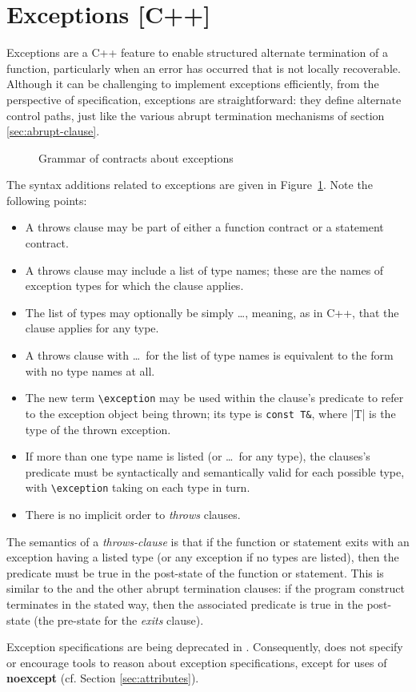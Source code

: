 \section{Exceptions [C++]}
\label{sec:exceptions}

Exceptions are a C++ feature to enable structured alternate termination of a function, particularly when an error has occurred that is not locally recoverable. Although it can be challenging to implement exceptions efficiently, from the perspective of specification, exceptions are straightforward: they define alternate control paths, just like the various abrupt termination mechanisms of section \ref{sec:abrupt-clause}.

\begin{figure}[t]
	\begin{cadre}
		
	\end{cadre}
	\caption{Grammar of contracts about exceptions}
	\label{fig:gram:throws-clause}
\end{figure}


The syntax additions related to exceptions are given in 
Figure~\ref{fig:gram:throws-clause}. Note the following points:
\begin{itemize}
\item A throws clause may be part of either a function contract or a statement contract.
\item A throws clause may include a list of type names; these are the names of exception types for which the
clause applies.
\item The list of types may optionally be simply \ldots, meaning, as in C++, that the clause applies for any type.
\item A throws clause with \ldots~for the list of type names is equivalent to the form with no type names at all.
\item The new term \lstinline|\exception| may be used within the clause's predicate to refer to the exception object being thrown; its type is \lstinline|const T&|, where \lstlinline|T| is the type of the thrown exception.
\item If more than one type name is listed (or \ldots~for any type), the clauses's predicate must be syntactically and semantically valid for each possible type, with \lstinline|\exception| taking on each type in turn.
\item There is no implicit order to \textsl{throws} clauses.
\end{itemize}
The semantics of a \textsl{throws-clause} is that if the function or statement exits with an exception having a listed type (or any exception if no types are listed), then the predicate must be true in the post-state of the function or statement. This is similar to the \ensures and the other abrupt termination clauses: if the program construct terminates in the stated way, then the associated predicate is true in the post-state (the pre-state for the \textsl{exits} clause).

Exception specifications are being deprecated in \lang. Consequently, \NAME{} does not specify or encourage tools to reason about \lang{} exception specifications, except for  uses of \textbf{noexcept} (cf. Section \ref{sec:attributes}).


